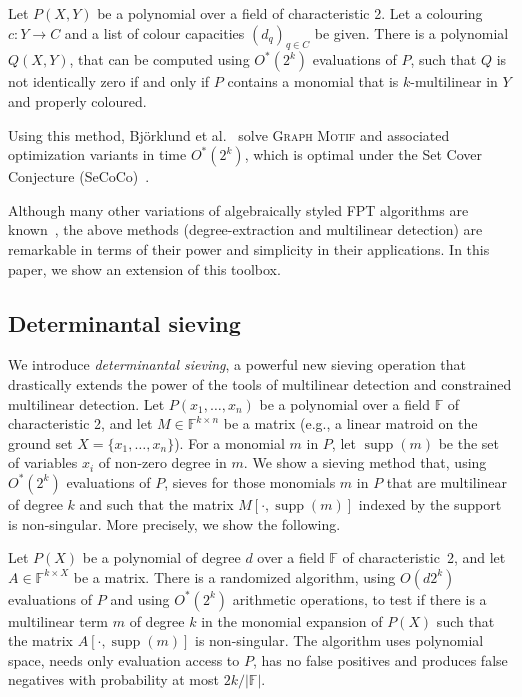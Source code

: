 \documentclass{theoretics}
\newcommand{\F}{\ensuremath{\mathbb F}\xspace}
\DeclareMathOperator{\supp}{supp}
\begin{document}
\begin{lemma}
  Let $P(X,Y)$ be a polynomial 
  over a field of characteristic 2. Let a colouring $c \colon Y \to C$
  and a list of colour capacities $(d_q)_{q \in C}$ be given.  
  There is a polynomial $Q(X,Y)$,
  that can be computed using $O^*(2^k)$ evaluations of $P$, such that $Q$
  is not identically zero if and only if $P$ contains a monomial that
  is $k$-multilinear in $Y$ and properly coloured. 
\end{lemma}

Using this method, Bj\"orklund et al.~\cite{BjorklundKK16} solve
\textsc{Graph Motif} and associated optimization variants
in time $O^*(2^k)$, which is optimal under the Set Cover Conjecture
(SeCoCo)~\cite{BjorklundKK16,CyganDLMNOPSW16seth}.

Although many other variations of algebraically styled FPT algorithms
are known~\cite{BjorklundHKK07convolution,BrandDH18,Brand19thesis,BrandP21,CyganNPPRW22twdconn,FominLPS16JACM},
the above methods (degree-extraction and multilinear detection)
are remarkable in terms of their power and simplicity in their applications.
In this paper, we show an extension of this toolbox. 

\subsection{Determinantal sieving}

We introduce \emph{determinantal sieving}, a powerful new sieving
operation that drastically extends the power of the tools of
multilinear detection and constrained multilinear detection.
Let $P(x_1,\ldots,x_n)$ be a polynomial over a field $\F$ of
characteristic 2, and let $M \in \F^{k \times n}$ be a matrix (e.g., a
linear matroid on the ground set $X=\{x_1,\ldots,x_n\}$). 
For a monomial $m$ in $P$, let $\supp(m)$ be the set of variables $x_i$
of non-zero degree in $m$.
We show a sieving method that, using $O^*(2^k)$ evaluations of $P$,
sieves for those monomials $m$ in $P$ that are multilinear of degree $k$ 
and such that the matrix $M[\cdot,\supp(m)]$ indexed by the support 
is non-singular. More precisely, we show the following.

\begin{theorem} \label{ithm:simple}
  Let $P(X)$
  be a polynomial of degree $d$ over a field $\F$ of characteristic~2, 
  and let $A \in \F^{k \times X}$ be a
  matrix. There is a randomized algorithm,
  using $O(d2^k)$ evaluations of $P$ and using $O^*(2^k)$ arithmetic operations, to test if there is a multilinear
  term $m$ of degree $k$ in the monomial expansion of $P(X)$ such that the matrix
  $A[\cdot,\supp(m)]$ is non-singular.
  The algorithm uses polynomial space, needs only evaluation access to $P$,
  has no false positives and produces false negatives with probability
  at most $2k/|\F|$. 
\end{theorem}
\end{document}
